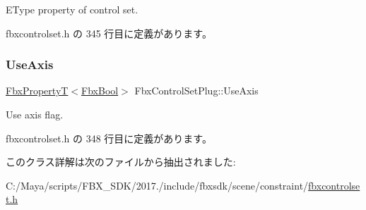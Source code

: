 E\+Type property of control set. 



 fbxcontrolset.\+h の 345 行目に定義があります。

\mbox{\label{class_fbx_control_set_plug_a037aaf41be834256757d7bf874d7531b}} 
\subsubsection{\texorpdfstring{Use\+Axis}{UseAxis}}
{\footnotesize\ttfamily \hyperlink{class_fbx_property_t}{Fbx\+PropertyT}$<$\hyperlink{fbxtypes_8h_a92e0562b2fe33e76a242f498b362262e}{Fbx\+Bool}$>$ Fbx\+Control\+Set\+Plug\+::\+Use\+Axis}



Use axis flag. 



 fbxcontrolset.\+h の 348 行目に定義があります。



このクラス詳解は次のファイルから抽出されました\+:\begin{DoxyCompactItemize}
\item 
C\+:/\+Maya/scripts/\+F\+B\+X\+\_\+\+S\+D\+K/2017./include/fbxsdk/scene/constraint/\hyperlink{fbxcontrolset_8h}{fbxcontrolset.\+h}\end{DoxyCompactItemize}
